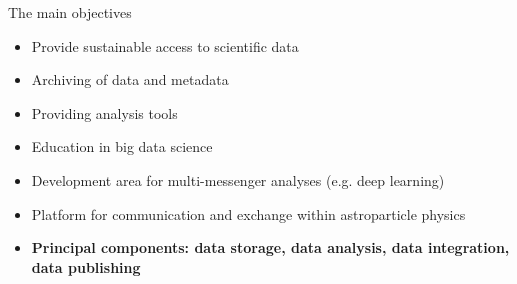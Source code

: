 


\begin{frame}{The main objectives}

\begin{itemize}
    \item  Provide sustainable access to scientific data
    \item  Archiving of data and metadata
    \item  Providing analysis tools
    \item  Education in big data science
    \item  Development area for multi-messenger analyses (e.g. deep learning)
    \item  Platform for communication and exchange within astroparticle physics
    \item  \textbf{Principal components: data storage, data analysis, data integration, data publishing}
\end{itemize}
\end{frame}


